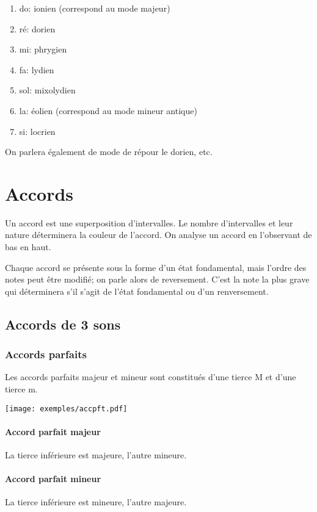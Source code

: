 \documentclass[11pt,a4paper]{scrreprt}
\begin{document}
\begin{enumerate}
\item do: ionien (correspond au mode majeur)
\item ré: dorien
\item mi: phrygien
\item fa: lydien
\item sol: mixolydien
\item la: éolien (correspond au mode mineur antique)
\item si: locrien
\end{enumerate}


On parlera également de \og mode de ré\fg pour le dorien, etc.


\chapter{Accords}
Un accord est une superposition d'intervalles. Le nombre d'intervalles et leur nature déterminera la couleur de l'accord. On analyse un accord en l'observant de bas en haut.

Chaque accord se présente sous la forme d'un état fondamental, mais l'ordre des notes peut être modifié; on parle alors de reversement. C'est la note la plus grave qui déterminera s'il s'agit de l'état fondamental ou d'un renversement.
\section{Accords de 3 sons}
\subsection{Accords parfaits}
Les accords parfaits majeur et mineur sont constitués d'une tierce M et d'une tierce m.
\begin{center}
   \texttt{[image: exemples/accpft.pdf]}
\end{center}


\subsubsection{Accord parfait majeur}\label{pftmaj}
La tierce inférieure est majeure, l'autre mineure.

\subsubsection{Accord parfait mineur}
La tierce inférieure est mineure, l'autre majeure.
\end{document}
